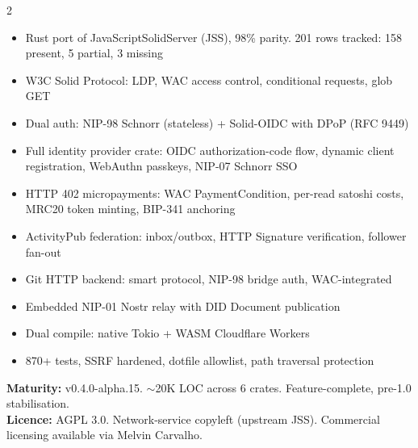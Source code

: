 \documentclass[10pt,a4paper]{article}
\begin{document}
\begin{multicols}{2}
{\color{emerald}\faLock}\;\\[2pt]
{\small
\begin{itemize}[leftmargin=8pt,itemsep=0pt,parsep=0pt,topsep=1pt,label={\color{emerald}\textbullet}]
  \item Rust port of JavaScriptSolidServer (JSS), 98\% parity. 201 rows tracked: 158 present, 5 partial, 3 missing
  \item W3C Solid Protocol: LDP, WAC access control, conditional requests, glob GET
  \item Dual auth: NIP-98 Schnorr (stateless) + Solid-OIDC with DPoP (RFC 9449)
  \item Full identity provider crate: OIDC authorization-code flow, dynamic client registration, WebAuthn passkeys, NIP-07 Schnorr SSO
  \item HTTP 402 micropayments: WAC PaymentCondition, per-read satoshi costs, MRC20 token minting, BIP-341 anchoring
  \item ActivityPub federation: inbox/outbox, HTTP Signature verification, follower fan-out
  \item Git HTTP backend: smart protocol, NIP-98 bridge auth, WAC-integrated
  \item Embedded NIP-01 Nostr relay with DID Document publication
  \item Dual compile: native Tokio + WASM Cloudflare Workers
  \item 870+ tests, SSRF hardened, dotfile allowlist, path traversal protection
\end{itemize}
\textbf{Maturity:} v0.4.0-alpha.15. $\sim$20K LOC across 6 crates. Feature-complete, pre-1.0 stabilisation.\\
\textbf{Licence:} AGPL 3.0. Network-service copyleft (upstream JSS). Commercial licensing available via Melvin Carvalho.
}

\vspace{6pt}


\end{multicols}
\end{document}
